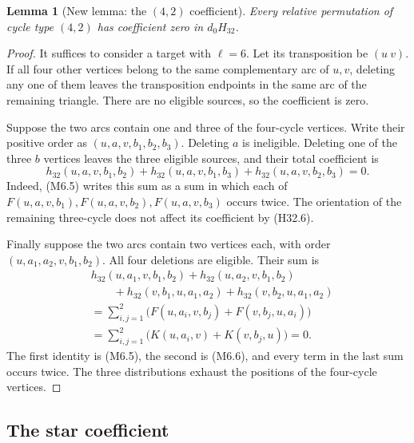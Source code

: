 \documentclass[11pt,oneside]{report}
\newtheorem{lemma}[theorem]{Lemma}
\theoremstyle{definition}
\numberwithin{equation}{section}
\begin{document}
\begin{lemma}[New lemma: the $(4,2)$ coefficient]\label{J21:lem:m6-four-two}
Every relative permutation of cycle type $(4,2)$ has coefficient zero
in $d_0H_{32}$.
\end{lemma}
\begin{proof}
It suffices to consider a target with $\ell=6$.
Let its transposition be $(u\ v)$.
If all four other vertices belong to the same complementary arc of
$u,v$, deleting any one of them leaves the transposition endpoints
in the same arc of the remaining triangle. There are no eligible
sources, so the coefficient is zero.

Suppose the two arcs contain one and three of the four-cycle vertices.
Write their positive order as $(u,a,v,b_1,b_2,b_3)$.
Deleting $a$ is ineligible. Deleting one of the three $b$ vertices
leaves the three eligible sources, and their total coefficient is
\[
 h_{32}(u,a,v,b_1,b_2)+h_{32}(u,a,v,b_1,b_3)
                         +h_{32}(u,a,v,b_2,b_3)=0.
\]
Indeed, (M6.5) writes this sum as a sum in which each of
$F(u,a,v,b_1),F(u,a,v,b_2),F(u,a,v,b_3)$ occurs twice.
The orientation of the remaining three-cycle does not affect its
coefficient by (H32.6).

Finally suppose the two arcs contain two vertices each, with order
$(u,a_1,a_2,v,b_1,b_2)$. All four deletions are eligible. Their sum is
\[
\begin{split}
 &h_{32}(u,a_1,v,b_1,b_2)+h_{32}(u,a_2,v,b_1,b_2)\\
 &\qquad+h_{32}(v,b_1,u,a_1,a_2)+h_{32}(v,b_2,u,a_1,a_2)\\
 &=\sum_{i,j=1}^2\bigl(F(u,a_i,v,b_j)+F(v,b_j,u,a_i)\bigr)\\
 &=\sum_{i,j=1}^2\bigl(K(u,a_i,v)+K(v,b_j,u)\bigr)=0.
\end{split}
\]
The first identity is (M6.5), the second is (M6.6), and every term
in the last sum occurs twice. The three distributions exhaust the
positions of the four-cycle vertices.
\end{proof}

\subsection{The star coefficient}
\end{document}
